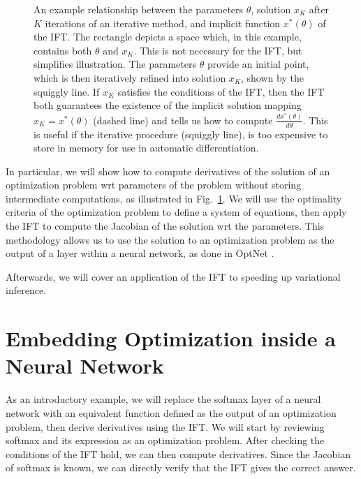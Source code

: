 \documentclass[11pt]{article}
\begin{document}
\begin{figure}
\centering
{}
\caption{
\label{fig:optift}
An example relationship between the parameters $\theta$,
solution $x_{K}$ after $K$ iterations of an iterative method,
and implicit function $x^*(\theta)$ of the IFT.
The rectangle depicts a space which, in this example,
contains both $\theta$ and $x_K$.
This is not necessary for the IFT, but simplifies illustration.
The parameters $\theta$ provide an initial point, which is then iteratively refined
into solution $x_{K}$, shown by the squiggly line.
If $x_{K}$ satisfies the conditions of the IFT, then the IFT both
guarantees the existence of the implicit solution mapping $x_K = x^*(\theta)$
(dashed line)
and tells us how to compute $\frac{dx^*(\theta)}{d\theta}$.
This is useful if the iterative procedure (squiggly line), is too expensive
to store in memory for use in automatic differentiation.
}
\end{figure}

In particular, we will show how to compute derivatives of the solution of an optimization problem
wrt parameters of the problem without storing intermediate computations,
as illustrated in Fig.~\ref{fig:optift}.
We will use the optimality criteria of the optimization problem to define a system of equations,
then apply the IFT to compute the Jacobian of the solution wrt the parameters.
This methodology allows us to use the solution to an optimization problem
as the output of a layer within a neural network,
as done in OptNet \citep{optnet}.

Afterwards, we will cover an application of the IFT to speeding up variational inference.

\section{Embedding Optimization inside a Neural Network}
As an introductory example,
we will replace the softmax layer of a neural network with an equivalent function
defined as the output of an optimization problem, then derive derivatives using the IFT.
We will start by reviewing softmax and its expression as an optimization problem.
After checking the conditions of the IFT hold, we can then compute derivatives.
Since the Jacobian of softmax is known, we can directly verify that the IFT gives
the correct answer.
\end{document}
